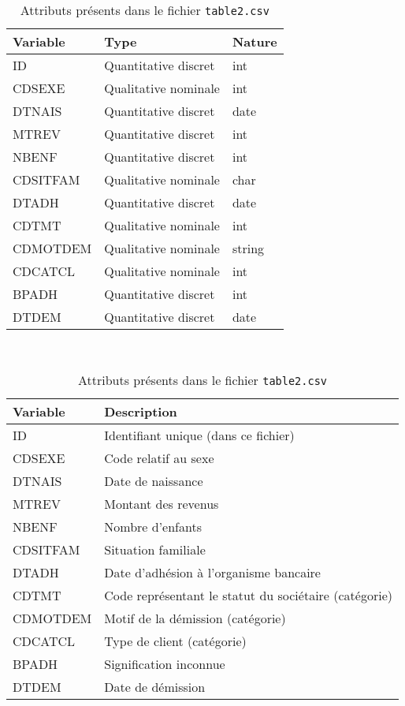 \documentclass{ceri/sty/rapport}
\begin{document}
\begin{table}[htb!]
	\begin{tabular}{l l l}
		\hline
		\rowcolor{fgLightRed} 
		\textbf{Variable} & \textbf{Type} & \textbf{Nature}	\\ 
		\hline
             ID & Quantitative discret & int \\
             CDSEXE & Qualitative nominale & int \\
             DTNAIS & Quantitative discret & date \\
             MTREV & Quantitative discret & int \\
             NBENF & Quantitative discret & int \\
             CDSITFAM & Qualitative nominale & char \\
             DTADH & Quantitative discret & date \\
             CDTMT & Qualitative nominale & int \\
             CDMOTDEM & Qualitative nominale & string \\
             CDCATCL & Qualitative nominale & int \\
             BPADH & Quantitative discret & int \\
             DTDEM & Quantitative discret & date \\
		\hline
	\end{tabular} \\
        \begin{tabular}{l l}
		\hline
		\rowcolor{fgLightRed} 
		\textbf{Variable} & \textbf{Description} \\ 
		\hline
             ID & Identifiant unique (dans ce fichier) \\
             CDSEXE & Code relatif au sexe \\
             DTNAIS & Date de naissance \\
             MTREV & Montant des revenus \\
             NBENF & Nombre d’enfants \\
             CDSITFAM & Situation familiale \\
             DTADH & Date d’adhésion à l’organisme bancaire \\
             CDTMT & Code représentant le statut du sociétaire (catégorie) \\
             CDMOTDEM & Motif de la démission (catégorie) \\
             CDCATCL & Type de client (catégorie) \\
             BPADH & Signification inconnue \\
             DTDEM & Date de démission \\
		\hline
	\end{tabular}
	\caption[]{Attributs présents dans le fichier \texttt{table2.csv}}
	\label{tab:attrCSV2}
\end{table}
\end{document}
